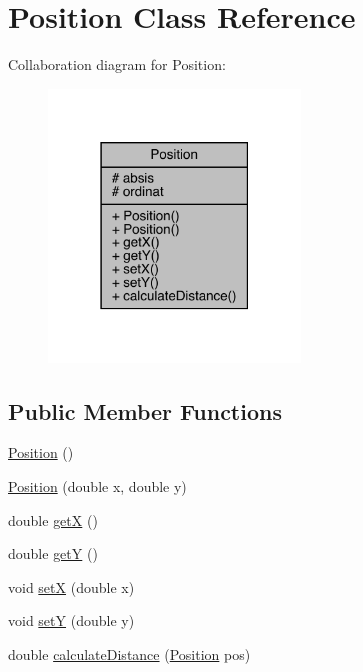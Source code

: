 \hypertarget{class_position}{}\section{Position Class Reference}
\label{class_position}


Collaboration diagram for Position\+:
\nopagebreak
\begin{figure}[H]
\begin{center}
\leavevmode
\includegraphics[width=190pt]{class_position__coll__graph}
\end{center}
\end{figure}
\subsection*{Public Member Functions}
\begin{DoxyCompactItemize}
\item 
\mbox{\hyperlink{class_position_aa3cc120f6a85735ff705672c1b99330d}{Position}} ()
\item 
\mbox{\hyperlink{class_position_a40b0c2c90ebd4a00d7310b013e48b691}{Position}} (double x, double y)
\item 
double \mbox{\hyperlink{class_position_a14c74938fcd12f380e0f3d19cfc8fb70}{getX}} ()
\item 
double \mbox{\hyperlink{class_position_acc59fee4dda06e7be2455916abe6a2a6}{getY}} ()
\item 
void \mbox{\hyperlink{class_position_a30f78db92c43f742e7108972be6de018}{setX}} (double x)
\item 
void \mbox{\hyperlink{class_position_aaf877e0285431a70b8a254ae14bf022e}{setY}} (double y)
\item 
double \mbox{\hyperlink{class_position_a300868e5df600558c34027a8619ba28b}{calculate\+Distance}} (\mbox{\hyperlink{class_position}{Position}} pos)
\end{DoxyCompactItemize}

